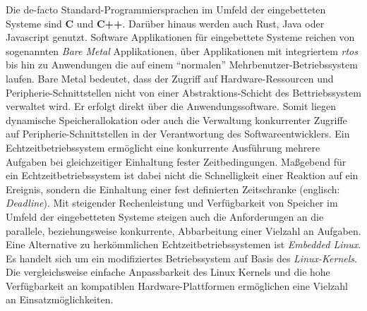 Die de-facto Standard-Programmiersprachen im Umfeld der eingebetteten Systeme
sind \textbf{C} und \textbf{C++}.
Darüber hinaus werden auch Rust, Java oder Javascript genutzt.
\newline
Software Applikationen für eingebettete Systeme reichen von sogenannten
\textit{Bare Metal} Applikationen, über Applikationen mit integriertem
\textit{\ac{rtos}} bis hin zu Anwendungen die auf einem \enquote{normalen}
Mehrbenutzer-Betriebssystem laufen.
\newline
Bare Metal bedeutet, dass der Zugriff auf Hardware-Ressourcen und
Peripherie-Schnittstellen nicht von einer Abstraktions-Schicht des
Bettriebssystem verwaltet wird.
Er erfolgt direkt über die Anwendungssoftware.
Somit liegen dynamische Speicherallokation oder auch die Verwaltung
konkurrenter Zugriffe auf Peripherie-Schnittstellen in der Verantwortung des
Softwareentwicklers.
\newline
Ein Echtzeitbetriebssystem ermöglicht eine konkurrente Ausführung mehrere
Aufgaben bei gleichzeitiger Einhaltung fester Zeitbedingungen.
Maßgebend für ein Echtzeitbetriebssystem ist dabei nicht die Schnelligkeit
einer Reaktion auf ein Ereignis, sondern die Einhaltung einer fest definierten
Zeitschranke (englisch: \textit{Deadline})\cite{BSKompakt_GrundlagenBs}.
\newline
Mit steigender Rechenleistung und Verfügbarkeit von Speicher im Umfeld der
eingebetteten Systeme steigen auch die Anforderungen an die parallele,
beziehungsweise konkurrente, Abbarbeitung einer Vielzahl an Aufgaben.
Eine Alternative zu herkömmlichen Echtzeitbetriebssystemen ist \textit{Embedded
Linux}.
Es handelt sich um ein modifiziertes Betriebssystem auf Basis des
\textit{Linux-Kernels}.
Die vergleichsweise einfache Anpassbarkeit des Linux Kernels und die hohe
Verfügbarkeit an kompatiblen Hardware-Plattformen ermöglichen eine Vielzahl an
Einsatzmöglichkeiten\cite{UbuntuBlogEmbeddedLinux}.

